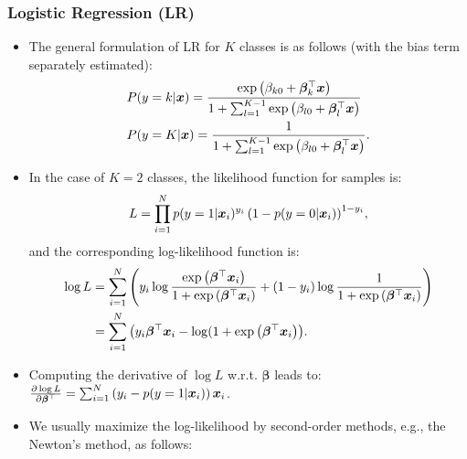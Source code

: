 {        \subsubsection{Logistic Regression (LR)}
            \begin{itemize}
                \item The general formulation of LR for $K$ classes is as follows (with the bias term separately estimated):
                    \begin{equation}
                        \begin{aligned}
                            & P(y=k | \bm{x}) = \frac{  \text{exp}\left( \beta_{k0} + \bm{\beta}_k^\top \bm{x}  \right) }{1 + \sum_{l=1}^{K-1}{ \text{exp}\left( \beta_{l0} + \bm{\beta}_l^\top \bm{x}  \right)  }} \\
                            & P(y=K | \bm{x}) = \frac{1}{1 + \sum_{l=1}^{K-1}{ \text{exp}\left( \beta_{l0} + \bm{\beta}_l^\top \bm{x}  \right)  }}.
                        \end{aligned}
                    \end{equation}
                \item In the case of $K=2$ classes, the likelihood function for \ndata samples is:
                    \begin{equation}
                        L = \prod_{i=1}^{N}{p(y=1 | \bm{x}_i)^{y_i} \left( 1-p(y=0 | \bm{x}_i) \right)^{1-y_i} },
                    \end{equation}
                and the corresponding log-likelihood function is:
                    \begin{equation}
                        \begin{aligned}
                        \log L & = \sum_{i=1}^{N}{\left( y_i \log\frac{ \text{exp}\left( \bm{\beta}^\top\bm{x}_i \right) }{1 +  \text{exp}\left( \bm{\beta}^\top \bm{x}_i  \right) }  + (1-y_i)\log\frac{1}{1+ \text{exp}\left( \bm{\beta}^\top \bm{x}_i \right) } \right) }  \\
                              & = \sum_{i=1}^{N}{\left( y_i \bm{\beta}^\top \bm{x}_i -\log(1 +  \text{exp}\left( \bm{\beta}^\top \bm{x}_i \right)  \right)}.
                        \end{aligned}
                    \end{equation}
                \item Computing the derivative of $\log L$ w.r.t. $\bm{\beta}$ leads to: 
                $\frac{\partial \log L}{\partial \bm{\beta}^\top} = \sum_{i=1}^{N}{\left( y_i - p(y=1|\bm{x}_i) \right) \bm{x}_i }$.
                \item We usually maximize the log-likelihood by second-order methods, e.g., the Newton's method, as follows:

\end{itemize}}
